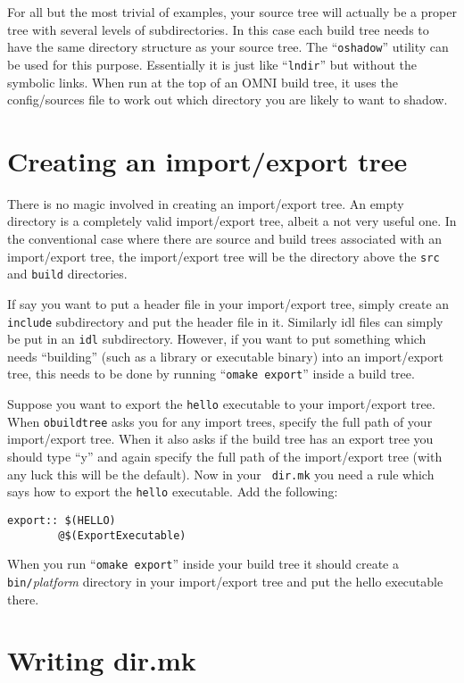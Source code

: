 \documentclass[11pt]{article}
\begin{document}
For all but the most trivial of examples, your source tree will actually be a
proper tree with several levels of subdirectories.  In this case each build
tree needs to have the same directory structure as your source tree.  The
``{\tt oshadow}'' utility can be used for this purpose.  Essentially it is just
like ``{\tt lndir}'' but without the symbolic links.  When run at the top of an
OMNI build tree, it uses the config/sources file to work out which directory
you are likely to want to shadow.

\section{Creating an import/export tree}

There is no magic involved in creating an import/export tree.  An empty
directory is a completely valid import/export tree, albeit a not very useful
one.  In the conventional case where there are source and build trees
associated with an import/export tree, the import/export tree will be the
directory above the {\tt src} and {\tt build} directories.

If say you want to put a header file in your import/export tree, simply create
an {\tt include} subdirectory and put the header file in it.  Similarly idl
files can simply be put in an {\tt idl} subdirectory.  However, if you want to
put something which needs ``building'' (such as a library or executable binary)
into an import/export tree, this needs to be done by running ``{\tt omake
export}'' inside a build tree.

Suppose you want to export the {\tt hello} executable to your import/export
tree.  When {\tt obuildtree} asks you for any import trees, specify the full
path of your import/export tree.  When it also asks if the build tree has an
export tree you should type ``y'' and again specify the full path of the
import/export tree (with any luck this will be the default).  Now in your {\tt
dir.mk} you need a rule which says how to export the {\tt hello} executable.
Add the following:

\begin{verbatim}
export:: $(HELLO)
        @$(ExportExecutable)
\end{verbatim}

When you run ``{\tt omake export}'' inside your build tree it should create a
{\tt bin/}{\it platform} directory in your import/export tree and put the hello
executable there.


\section{Writing dir.mk}
\end{document}
